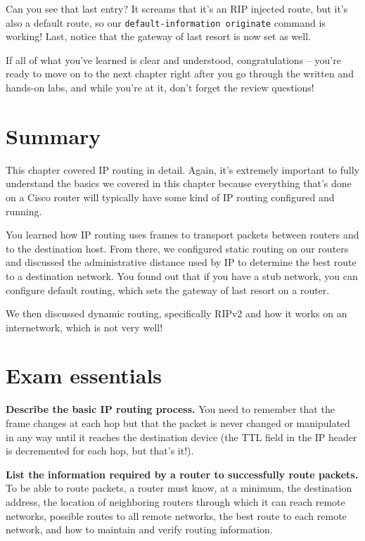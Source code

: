 Can you see that last entry? It screams that it's an RIP injected route,
but it's also a default route, so our
\texttt{default-information\ originate} command is working! Last, notice
that the gateway of last resort is now set as well.

If all of what you've learned is clear and understood,
congratulations -- you're ready to move on to the next chapter right
after you go through the written and hands-on labs, and while you're at
it, don't forget the review questions!



\section{Summary}

This chapter covered IP routing in detail. Again, it's extremely
important to fully understand the basics we covered in this chapter
because everything that's done on a Cisco router will typically have
some kind of IP routing configured and running.

You learned how IP routing uses frames to transport packets between
routers and to the destination host. From there, we configured static
routing on our routers and discussed the administrative distance used by
IP to determine the best route to a destination network. You found out
that if you have a stub network, you can configure default routing,
which sets the gateway of last resort on a router.

We then discussed dynamic routing, specifically RIPv2 and how it works
on an internetwork, which is not very well!



\section{Exam essentials}

\textbf{Describe the basic IP routing process.} You need to remember
that the frame changes at each hop but that the packet is never changed
or manipulated in any way until it reaches the destination device (the
TTL field in the IP header is decremented for each hop, but that's it!).

\textbf{List the information required by a router to successfully route
packets.} To be able to route packets, a router must know, at a minimum,
the destination address, the location of neighboring routers through
which it can reach remote networks, possible routes to all remote
networks, the best route to each remote network, and how to maintain and
verify routing information.

